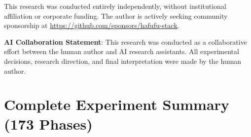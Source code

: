 \documentclass[11pt,a4paper]{article}
\begin{document}
This research was conducted entirely independently, without institutional affiliation or corporate funding. The author is actively seeking community sponsorship at \url{https://github.com/sponsors/hafufu-stack}.

\vspace{1em}
\noindent \textbf{AI Collaboration Statement}: This research was conducted as a collaborative effort between the human author and AI research assistants. All experimental decisions, research direction, and final interpretation were made by the human author.

\section*{Complete Experiment Summary (173 Phases)}
\end{document}
